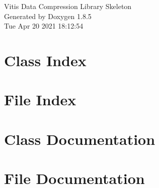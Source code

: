 \documentclass[twoside]{book}
\newcommand{\clearemptydoublepage}{%
  \newpage{\pagestyle{empty}\cleardoublepage}%
}
\begin{document}
\hypersetup{pageanchor=false}
\begin{titlepage}
\vspace*{7cm}
\begin{center}%
{\Large Vitis Data Compression Library Skeleton }\\
\vspace*{1cm}
{\large Generated by Doxygen 1.8.5}\\
\vspace*{0.5cm}
{\small Tue Apr 20 2021 18:12:54}\\
\end{center}
\end{titlepage}
\clearemptydoublepage
\tableofcontents
\clearemptydoublepage
{}
\hypersetup{pageanchor=true}

\chapter{Class Index}

\chapter{File Index}

\chapter{Class Documentation}









\chapter{File Documentation}




























\newpage
{}
{}
\printindex
\end{document}
